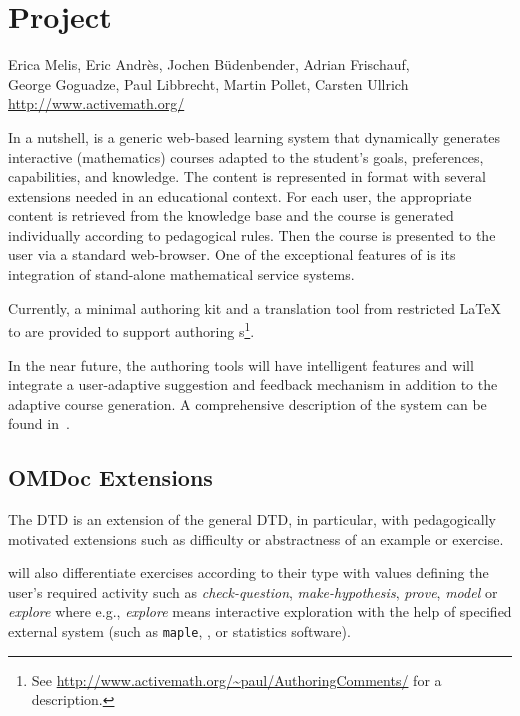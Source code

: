 \section{Project {\else{\activemath}\fi}}\label{sec:activemath}
\begin{center}\large\sf
Erica Melis, Eric Andr\`es, Jochen B\"udenbender, Adrian Frischauf,\\
     George Goguadze, Paul Libbrecht, Martin Pollet, Carsten Ullrich\\
\url{http://www.activemath.org/}
\end{center}

In a nutshell, {\activemath} is a generic web-based learning system that
dynamically generates interactive (mathematics) courses adapted to the student's
goals, preferences, capabilities, and knowledge.  The content is represented in
{\omdoc} format with several extensions needed in an educational context. For each
user, the appropriate content is retrieved from the knowledge base {\mbase} and
the course is generated individually according to pedagogical rules.  Then the
course is presented to the user via a standard web-browser. One of the exceptional
features of {\activemath} is its integration of stand-alone mathematical service
systems.

Currently, a minimal authoring kit and a translation tool from restricted {\LaTeX}
to {\omdoc} are provided to support authoring {\omdoc}s\footnote{See
  \url{http://www.activemath.org/~paul/AuthoringComments/} for a description.}.

In the near future, the authoring tools will have intelligent features and
{\activemath} will integrate a user-adaptive suggestion and feedback mechanism in
addition to the adaptive course generation. A comprehensive description of the
system can be found in~\cite{activemathAIEDJ01}.

\subsection{OMDoc Extensions}
The {\activemath} DTD is an extension of the general {\omdoc} DTD, in particular,
with pedagogically motivated extensions such as difficulty or abstractness of an
example or exercise.

{\activemath} will also differentiate exercises according to their type with
values defining the user's required activity such as {\it check-question}, {\it
  make-hypothesis}, {\it prove}, {\it model} or {\it explore} where e.g.,
\textit{explore} means interactive exploration with the help of specified external
system (such as \texttt{maple}, {\OMEGA}, or statistics software).


